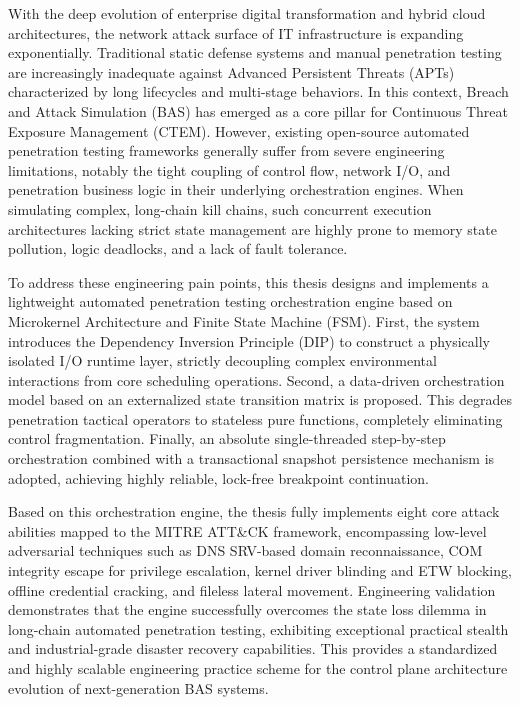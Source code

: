 With the deep evolution of enterprise digital transformation and hybrid cloud architectures, the network attack surface of IT infrastructure is expanding exponentially. Traditional static defense systems and manual penetration testing are increasingly inadequate against Advanced Persistent Threats (APTs) characterized by long lifecycles and multi-stage behaviors. In this context, Breach and Attack Simulation (BAS) has emerged as a core pillar for Continuous Threat Exposure Management (CTEM). However, existing open-source automated penetration testing frameworks generally suffer from severe engineering limitations, notably the tight coupling of control flow, network I/O, and penetration business logic in their underlying orchestration engines. When simulating complex, long-chain kill chains, such concurrent execution architectures lacking strict state management are highly prone to memory state pollution, logic deadlocks, and a lack of fault tolerance.

To address these engineering pain points, this thesis designs and implements a lightweight automated penetration testing orchestration engine based on Microkernel Architecture and Finite State Machine (FSM). First, the system introduces the Dependency Inversion Principle (DIP) to construct a physically isolated I/O runtime layer, strictly decoupling complex environmental interactions from core scheduling operations. Second, a data-driven orchestration model based on an externalized state transition matrix is proposed. This degrades penetration tactical operators to stateless pure functions, completely eliminating control fragmentation. Finally, an absolute single-threaded step-by-step orchestration combined with a transactional snapshot persistence mechanism is adopted, achieving highly reliable, lock-free breakpoint continuation.

Based on this orchestration engine, the thesis fully implements eight core attack abilities mapped to the MITRE ATT\&CK framework, encompassing low-level adversarial techniques such as DNS SRV-based domain reconnaissance, COM integrity escape for privilege escalation, kernel driver blinding and ETW blocking, offline credential cracking, and fileless lateral movement. Engineering validation demonstrates that the engine successfully overcomes the state loss dilemma in long-chain automated penetration testing, exhibiting exceptional practical stealth and industrial-grade disaster recovery capabilities. This provides a standardized and highly scalable engineering practice scheme for the control plane architecture evolution of next-generation BAS systems.
